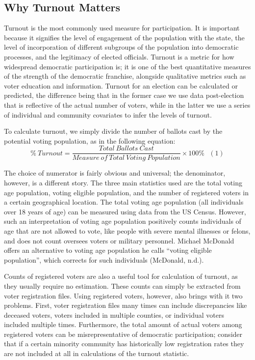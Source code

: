 \documentclass[12pt,twoside]{reedthesis}
\begin{document}
  \subsection{Why Turnout Matters}\label{why-turnout-matters}
  
  Turnout is the most commonly used measure for participation. It is
  important because it signifies the level of engagement of the population
  with the state, the level of incorporation of different subgroups of the
  population into democratic processes, and the legitimacy of elected
  officials. Turnout is a metric for how widespread democratic
  participation is; it is one of the best quantitative measures of the
  strength of the democratic franchise, alongside qualitative metrics such
  as voter education and information. Turnout for an election can be
  calculated or predicted, the difference being that in the former case we
  use data post-election that is reflective of the actual number of
  voters, while in the latter we use a series of individual and community
  covariates to infer the levels of turnout.
  
  To calculate turnout, we simply divide the number of ballots cast by the
  potential voting population, as in the following equation:\\
  \[ \% ~Turnout = \frac{Total~Ballots~Cast}{Measure~of~Total~Voting~Population}\times100\%~~~(1)\]
  
  The choice of numerator is fairly obvious and universal; the
  denominator, however, is a different story. The three main statistics
  used are the total voting age population, voting eligible population,
  and the number of registered voters in a certain geographical location.
  The total voting age population (all individuals over 18 years of age)
  can be measured using data from the US Census. However, such an
  interpretation of voting age population positively counts individuals of
  age that are not allowed to vote, like people with severe mental
  illnesses or felons, and does not count oversees voters or military
  personnel. Michael McDonald offers an alternative to voting age
  population he calls ``voting eligible population'', which corrects for
  such individuals (McDonald, n.d.).
  
  Counts of registered voters are also a useful tool for calculation of
  turnout, as they usually require no estimation. These counts can simply
  be extracted from voter registration files. Using registered voters,
  however, also brings with it two problems. First, voter registration
  files many times can include discrepancies like deceased voters, voters
  included in multiple counties, or individual voters included multiple
  times. Furthermore, the total amount of actual voters among registered
  voters can be misrepresentative of democratic participation; consider
  that if a certain minority community has historically low registration
  rates they are not included at all in calculations of the turnout
  statistic.
  
\end{document}
